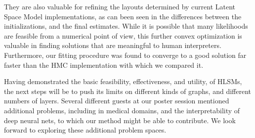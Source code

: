 \documentclass{article}
\begin{document}
They are also valuable for refining the layouts determined by current Latent Space Model implementations, as can been seen in the differences between the initializations, and the final estimates. While it is possible that many likelihoods are feasible from a numerical point of view, this further convex optimization is valuable in finding solutions that are meaningful to human interpreters. Furthermore, our fitting procedure was found to converge to a good solution far faster than the HMC implementation with which we compared it.

Having demonstrated the basic feasibility, effectiveness, and utility, of HLSMs, the next steps will be to push its limits on different kinds of graphs, and different numbers of layers. Several different guests at our poster session mentioned additional problems, including in medical domains, and the interpretability of deep neural nets, to which our method might be able to contribute. We look forward to exploring these additional problem spaces.


\end{document}

